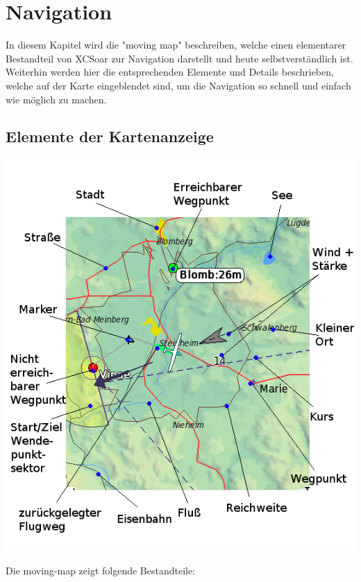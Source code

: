 \chapter{Navigation}\label{cha:navigation}

In diesem Kapitel wird die "moving map" beschreiben, welche einen elementarer Bestandteil von \textsf{XCSoar} zur Navigation darstellt und heute selbstverständlich ist. Weiterhin werden hier die entsprechenden Elemente und Details beschrieben, welche auf der Karte eingeblendet sind, um die Navigation so schnell und einfach wie möglich zu machen.

\section{Elemente der Kartenanzeige}

\begin{maxipage}
\includegraphics[angle=0,width=0.9\linewidth,keepaspectratio='true']{figures/fig-map.png}
\end{maxipage}

Die moving-map zeigt folgende Bestandteile:

